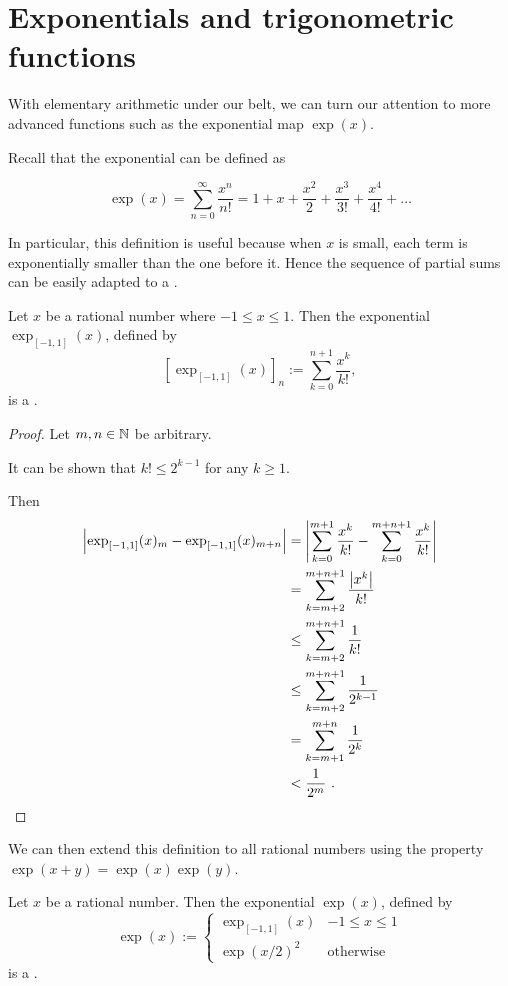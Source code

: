 \documentclass[leqno]{report}
\begin{document}
\section{Exponentials and trigonometric functions}

With elementary arithmetic under our belt, we can turn our attention to more advanced functions such as the exponential map $\exp(x)$.

Recall that the exponential can be defined as

\[
    \exp(x) = \sum_{n=0}^\infty \frac{x^n}{n!}
    = 1 + x + \frac{x^2}{2} + \frac{x^3}{3!} + \frac{x^4}{4!} + \ldots
\]

In particular, this definition is useful because when $x$ is small, each term is exponentially smaller than the one before it. Hence the sequence of partial sums can be easily adapted to a \FCCS.

\begin{Proposition}
    Let $x$ be a rational number where $-1 \leq x \leq 1$. Then the exponential $\exp_{[-1,1]}(x)$, defined by
    \[
        \left[\exp_{[-1,1]}(x)\right]_n := \sum_{k=0}^{n+1} \frac{x^k}{k!},
    \]
    is a \FCCS.
\end{Proposition}

\begin{proof}
    Let $m, n \in \mathbb{N}$ be arbitrary.

    It can be shown that $k! \leq 2^{k-1}$ for any $k \geq 1$.

    Then
    \begin{align*}
        \left| \exp_{[-1,1]}(x)_m - \exp_{[-1,1]}(x)_{m+n} \right|
        &= \left| \sum_{k=0}^{m+1} \frac{x^k}{k!} - \sum_{k=0}^{m+n+1} \frac{x^k}{k!} \right| \\
        &= \sum_{k=m+2}^{m+n+1} \frac{\left| x^k \right|}{k!} \\
        &\leq \sum_{k=m+2}^{m+n+1} \frac{1}{k!} \\
        &\leq \sum_{k=m+2}^{m+n+1} \frac{1}{2^{k-1}} \\
        &= \sum_{k=m+1}^{m+n} \frac{1}{2^k} \\
        &< \frac{1}{2^m} \ . \qedhere
    \end{align*}
\end{proof}

We can then extend this definition to all rational numbers using the property $\exp(x + y) = \exp(x)\exp(y)$.

\begin{Corollary}[Exponential on $\Q$]
    Let $x$ be a rational number. Then the exponential $\exp(x)$, defined by
    \[
        \exp(x) := \begin{cases}
            \exp_{[-1,1]}(x) & -1 \leq x \leq 1 \\
            \exp(x/2)^2 & \textrm{otherwise}
        \end{cases}
    \]
    is a \FCCS.
\end{Corollary}
\end{document}

